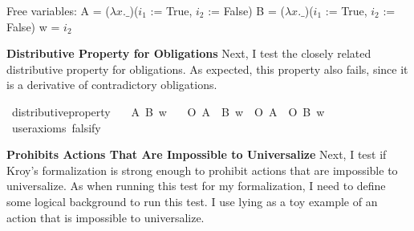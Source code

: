 \begin{isabellebody}
{  Free variables:
    A = ($\lambda x. \_$)($i_1$ := True, $i_2$  := False)
    B = ($\lambda x. \_$)($i_1$  := True, $i_2$  := False)
    w = $i_2$ \color{black}%
}%
\endisatagproof
{\isafoldproof}%
%
\isadelimproof
%
\endisadelimproof
%
\begin{isamarkuptext}%
\noindent \textbf{Distributive Property for Obligations} Next, I test the closely related 
distributive property for obligations. As expected, this property also fails, since it is a derivative 
of contradictory obligations.%
\end{isamarkuptext}\isamarkuptrue%
\isamarkupfalse%
\ distributive{\isacharunderscore}property{\isacharcolon}\isanewline
\ \ \ A\ B\ w\isanewline
\ \ \ {\isachardoublequoteopen}O\ {\isacharbraceleft}A\ \isactrlbold {\isasymand}\ B{\isacharbraceright}\ w\ {\isasymequiv}\ O\ {\isacharbraceleft}A{\isacharbraceright}\ \isactrlbold {\isasymand}\ O\ {\isacharbraceleft}B{\isacharbraceright}\ w{\isachardoublequoteclose}\isanewline
\ \ \isamarkupfalse%
\ {\isacharbrackleft}user{\isacharunderscore}axioms{\isacharcomma}\ falsify{\isacharbrackright}%
\isadelimproof
\ %
\endisadelimproof
%
\isatagproof
{}\isamarkupfalse%
\isanewline
%
%
\endisatagproof
{\isafoldproof}%
%
\isadelimproof
%
\endisadelimproof
%
\begin{isamarkuptext}%
\noindent \textbf{Prohibits Actions That Are Impossible to Universalize} Next, I test if Kroy's
formalization is strong enough to prohibit actions that are impossible to universalize. As when running
this test for my formalization, I need to define some logical background to run this test. I 
use lying as a toy example of an action that is impossible to universalize.  


\end{isamarkuptext}
\end{isabellebody}
